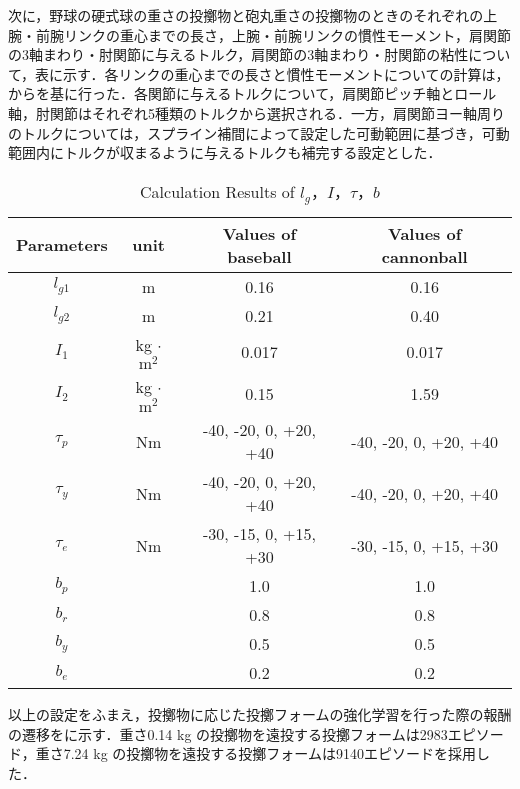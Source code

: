 次に，野球の硬式球の重さの投擲物と砲丸重さの投擲物のときのそれぞれの上腕・前腕リンクの重心までの長さ，上腕・前腕リンクの慣性モーメント，肩関節の3軸まわり・肘関節に与えるトルク，肩関節の3軸まわり・肘関節の粘性について，表に示す．各リンクの重心までの長さと慣性モーメントについての計算は，からを基に行った．各関節に与えるトルクについて，肩関節ピッチ軸とロール軸，肘関節はそれぞれ5種類のトルクから選択される．一方，肩関節ヨー軸周りのトルクについては，スプライン補間によって設定した可動範囲に基づき，可動範囲内にトルクが収まるように与えるトルクも補完する設定とした．

\begin{table}[tb]
  \begin{center}
    \caption{Calculation Results of $l_{g}$，$I$，$\tau$，$b$}

    \begin{tabular}{c|c|c|c}
      \hline
      Parameters & unit & Values of baseball & Values of cannonball \\
      \hline
      $l_{g1}$ & m & 0.16 & 0.16 \\
      $l_{g2}$ & m & 0.21 & 0.40 \\
      $I_{1}$ & kg $\cdot$ $\mathrm{m}^2$ & 0.017 & 0.017 \\
      $I_{2}$ & kg $\cdot$ $\mathrm{m}^2$ & 0.15 & 1.59 \\
      $\tau_{p}$ & Nm & -40, -20, 0, +20, +40 & -40, -20, 0, +20, +40 \\
      $\tau_{y}$ & Nm & -40, -20, 0, +20, +40 & -40, -20, 0, +20, +40 \\
      $\tau_{e}$ & Nm & -30, -15, 0, +15, +30 & -30, -15, 0, +15, +30 \\
      $b_{p}$ &  & 1.0 & 1.0\\
      $b_{r}$ &  & 0.8 & 0.8\\
      $b_{y}$ &  & 0.5 & 0.5\\
      $b_{e}$ &  & 0.2 & 0.2\\
      \hline
    \end{tabular}
  \end{center}
\end{table}

以上の設定をふまえ，投擲物に応じた投擲フォームの強化学習を行った際の報酬の遷移をに示す．重さ0.14 kg の投擲物を遠投する投擲フォームは2983エピソード，重さ7.24 kg の投擲物を遠投する投擲フォームは9140エピソードを採用した．



